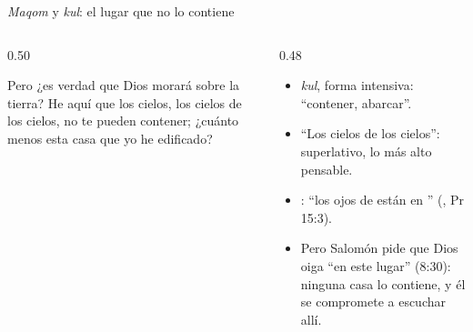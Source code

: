 \begin{frame}{\emph{Maqom} y \emph{kul}: el lugar que no lo contiene}
\begin{columns}[c,onlytextwidth]
\begin{column}{0.50\textwidth}
\begin{cita}Pero ¿es verdad que Dios morará sobre la tierra? He aquí que los cielos, los cielos de los cielos, no te pueden contener; ¿cuánto menos esta casa que yo he edificado?\end{cita}
\begin{center}\scriptsize{}\end{center}
\end{column}
\begin{column}{0.48\textwidth}\small
\begin{itemize}
\item {} \emph{kul}, forma intensiva: ``contener, abarcar''.
\item ``Los cielos de los cielos'': superlativo, lo más alto pensable.
\item {}: ``los ojos de \SENOR{} están en '' (, Pr 15:3).
\item Pero Salomón pide que Dios oiga ``en este lugar'' (8:30): ninguna casa lo contiene, y él se compromete a escuchar allí.
\end{itemize}
\end{column}
\end{columns}
\end{frame}

